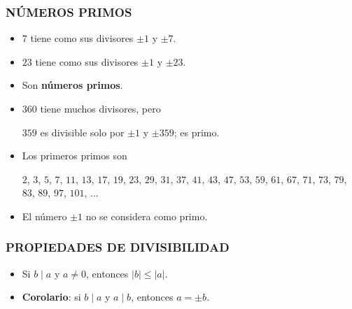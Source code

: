 \begin{frame}
  \frametitle{NÚMEROS PRIMOS}

  \begin{itemize}
  \item<2-> $7$ tiene como sus divisores $\pm 1$ y $\pm 7$.

  \item<3-> $23$ tiene como sus divisores $\pm 1$ y $\pm 23$.

  \item<4-> Son \textbf{números primos}.

  \item<5-> $360$ tiene muchos divisores, pero

    $359$ es divisible solo por $\pm 1$ y $\pm 359$; es primo.

  \item<6-> Los primeros primos son

    $2$, $3$, $5$, $7$, $11$, $13$, $17$, $19$, $23$, $29$, $31$, $37$, $41$,
    $43$, $47$, $53$, $59$, $61$, $67$, $71$, $73$, $79$, $83$, $89$, $97$,
    $101$, $\ldots$

  \item<7-> El número $\pm 1$ no se considera como primo.
  \end{itemize}
\end{frame}

\begin{frame}
  \frametitle{PROPIEDADES DE DIVISIBILIDAD}

  \begin{itemize}
  \item<2-> Si $b \mid a$ y $a \ne 0$, entonces $|b| \le |a|$.


  \item<4-> \textbf{Corolario}: si $b \mid a$ y $a \mid b$, entonces
    $a = \pm b$.

  \end{itemize}
\end{frame}

